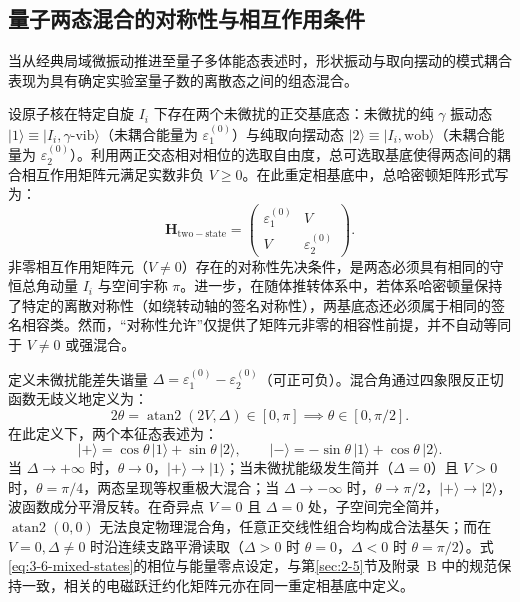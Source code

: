 \subsection{量子两态混合的对称性与相互作用条件}\label{sec:3-6-2}

当从经典局域微振动推进至量子多体能态表述时，形状振动与取向摆动的模式耦合表现为具有确定实验室量子数的离散态之间的组态混合。

设原子核在特定自旋 $I_i$ 下存在两个未微扰的正交基底态：未微扰的纯 $\gamma$ 振动态 $|1\rangle \equiv |I_i, \gamma\text{-vib}\rangle$（未耦合能量为 $\varepsilon_1^{(0)}$）与纯取向摆动态 $|2\rangle \equiv |I_i, \text{wob}\rangle$（未耦合能量为 $\varepsilon_2^{(0)}$）。利用两正交态相对相位的选取自由度，总可选取基底使得两态间的耦合相互作用矩阵元满足实数非负 $V \ge 0$。在此重定相基底中，总哈密顿矩阵形式写为：
\begin{equation}\label{eq:3-6-two-state-h}
\mathbf{H}_{\mathrm{two-state}} = \begin{pmatrix} \varepsilon_1^{(0)} & V \\ V & \varepsilon_2^{(0)} \end{pmatrix} .
\end{equation}
非零相互作用矩阵元（$V \neq 0$）存在的对称性先决条件，是两态必须具有相同的守恒总角动量 $I_i$ 与空间宇称 $\pi$。进一步，在随体推转体系中，若体系哈密顿量保持了特定的离散对称性（如绕转动轴的签名对称性），两基底态还必须属于相同的签名相容类。然而，“对称性允许”仅提供了矩阵元非零的相容性前提，并不自动等同于 $V \neq 0$ 或强混合。

定义未微扰能差失谐量 $\Delta = \varepsilon_1^{(0)} - \varepsilon_2^{(0)}$（可正可负）。混合角通过四象限反正切函数无歧义地定义为：
\begin{equation}\label{eq:3-6-mixing-ratio}
2\theta = \operatorname{atan2}(2V, \Delta) \in [0, \pi] \implies \theta \in [0, \pi/2] .
\end{equation}
在此定义下，两个本征态表述为：
\begin{equation}\label{eq:3-6-mixed-states}
|+\rangle = \cos\theta\,|1\rangle + \sin\theta\,|2\rangle , \qquad
|-\rangle = -\sin\theta\,|1\rangle + \cos\theta\,|2\rangle .
\end{equation}
当 $\Delta \to +\infty$ 时，$\theta \to 0$，$|+\rangle \to |1\rangle$；当未微扰能级发生简并（$\Delta = 0$）且 $V > 0$ 时，$\theta = \pi/4$，两态呈现等权重极大混合；当 $\Delta \to -\infty$ 时，$\theta \to \pi/2$，$|+\rangle \to |2\rangle$，波函数成分平滑反转。在奇异点 $V = 0$ 且 $\Delta = 0$ 处，子空间完全简并，$\operatorname{atan2}(0,0)$ 无法良定物理混合角，任意正交线性组合均构成合法基矢；而在 $V=0, \Delta \neq 0$ 时沿连续支路平滑读取（$\Delta > 0$ 时 $\theta = 0$，$\Delta < 0$ 时 $\theta = \pi/2$）。式\eqref{eq:3-6-mixed-states}的相位与能量零点设定，与第\ref{sec:2-5}节及附录~B 中的规范保持一致，相关的电磁跃迁约化矩阵元亦在同一重定相基底中定义。

